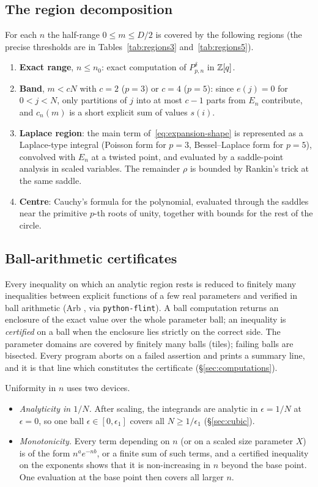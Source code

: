 \subsection{The region decomposition}\label{sec:regions}

For each $n$ the half-range $0\le m\le D/2$ is covered by the following regions (the precise thresholds are in
Tables~\ref{tab:regions3} and~\ref{tab:regions5}).
\begin{enumerate}
\item \textbf{Exact range}, $n\le n_0$: exact computation of $P_{p,n}^\delta$ in $\mathbb Z[q]$.
\item \textbf{Band}, $m<cN$ with $c=2$ ($p=3$) or $c=4$ ($p=5$): since $e(j)=0$ for $0<j<N$, only partitions of $j$
into at most $c-1$ parts from $E_n$ contribute, and $c_n(m)$ is a short explicit sum of values $s(i)$.
\item \textbf{Laplace region}: the main term of~\eqref{eq:expansion-shape} is represented as a Laplace-type integral
(Poisson form for $p=3$, Bessel--Laplace form for $p=5$), convolved with $E_n$ at a twisted point, and evaluated by a
saddle-point analysis in scaled variables. The remainder $\rho$ is bounded by Rankin's trick at the same saddle.
\item \textbf{Centre}: Cauchy's formula for the polynomial, evaluated through the saddles near the primitive $p$-th roots
of unity, together with bounds for the rest of the circle.
\end{enumerate}

\subsection{Ball-arithmetic certificates}\label{sec:certs-general}

Every inequality on which an analytic region rests is reduced to finitely many inequalities between explicit functions
of a few real parameters and verified in ball arithmetic (Arb \cite{Arb}, via \texttt{python-flint}). A ball computation
returns an enclosure of the exact value over the whole parameter ball; an inequality is \emph{certified} on a ball when
the enclosure lies strictly on the correct side. The parameter domains are covered by finitely many balls (tiles);
failing balls are bisected. Every program aborts on a failed assertion and prints a summary line, and it is that line
which constitutes the certificate (\S\ref{sec:computations}).

Uniformity in $n$ uses two devices.
\begin{itemize}
\item \emph{Analyticity in $1/N$.} After scaling, the integrands are analytic in $\epsilon=1/N$ at $\epsilon=0$, so one
ball $\epsilon\in[0,\epsilon_1]$ covers all $N\ge1/\epsilon_1$ (\S\ref{sec:cubic}).
\item \emph{Monotonicity.} Every term depending on $n$ (or on a scaled size parameter $X$) is of the form
$n^ae^{-nb}$, or a finite sum of such terms, and a certified inequality on the exponents shows that it is non-increasing
in $n$ beyond the base point. One evaluation at the base point then covers all larger $n$.
\end{itemize}

